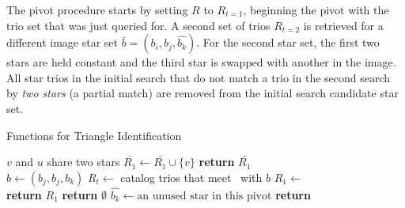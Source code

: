 The pivot procedure starts by setting $R$ to $R_{t=1}$, beginning the pivot with the trio set that was just queried
for.
A second set of trios $R_{t=2}$ is retrieved for a different image star set $\bar{b} = (b_i, b_j, \hat{b_k})$.
For the second star set, the first two stars are held constant and the third star is swapped with another in the image.
All star trios in the initial search that do not match a trio in the second search by \textit{two stars} (a partial
match) are removed from the initial search candidate star set.

\begin{algorithm}
    \caption{Functions for Triangle Identification} \label{algorithm:triangleHelper}
    \begin{algorithmic}[1]
        \LineComment $v$ and $u$ share two stars
        \State $\bar{R_1} \gets \bar{R_1} \cup \{v\}$
        \EndIf
        \EndFor
        \State \textbf{return} $\bar{R_1}$
        \EndFunction
        \\
        \State $b \gets (b_j, b_j, b_k)$
        \State $R_t \gets $ catalog trios that meet~ with $b$
        \State $R_1 \gets $ 
        \\
        \State \textbf{return} $R_1$
        \State \textbf{return} $\emptyset$
        \Else
        \State $\hat{b_k} \gets \text{an unused star in this pivot}$
        \State \textbf{return} 
        \EndIf
        \EndFunction
    \end{algorithmic}
\end{algorithm}

